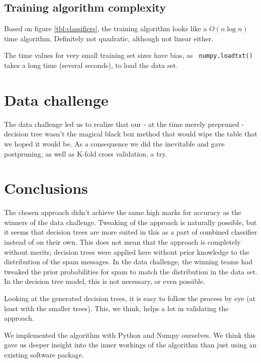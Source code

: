 \documentclass[a4paper,10pt]{article}
\begin{document}
\subsection{Training algorithm complexity}

Based on figure \ref{tbl:classifiers}, the training algorithm looks like a
$O(n\log{n})$ time algorithm.  Definitely not quadratic, although not linear
either.

The time values for very small training set sizes have bias, as {\tt
  numpy.loadtxt()} takes a long time (several seconds), to load the data
set.

\section{Data challenge}


The data challenge led us to realize that our - at the time merely
prepruned - decision tree wasn't the magical black box method
that would wipe the table that we hoped it would be.
As a consequence we did the inevitable and gave postpruning,
as well as K-fold cross validation, a try.


\section{Conclusions}

The chosen approach didn't achieve the same high marks for accuracy as
the winners of the data challenge.  Tweaking of the approach is
naturally possible, but it seems that decision trees are more suited in
this as a part of combined classifier instead of on their own.  This
does not mean that the approach is completely without merits; decision
trees were applied here without prior knowledge to the distribution of
the spam messages.  In the data challenge, the winning teams had tweaked
the prior probabilities for spam to match the distribution in the data
set.  In the decision tree model, this is not necessary, or even
possible.

Looking at the generated decision trees, it is easy to follow the
process by eye (at least with the smaller trees).  This, we think, helps
a lot in validating the approach.

We implemented the algorithm with Python and Numpy ourselves.  We think
this gave us deeper insight into the inner workings of the algorithm
than just using an existing software package.
\end{document}
